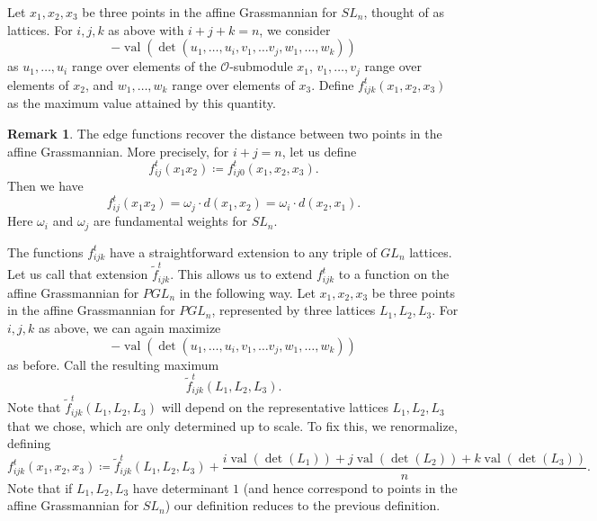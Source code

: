 \documentclass[10pt]{amsart}
\theoremstyle{definition}
\newtheorem{rema}[theorem]{Remark}
\newcommand{\cO}{\mathcal{O}}
\newcommand{\val}{\operatorname{val}}
\begin{document}
Let $x_1, x_2, x_3$ be three points in the affine Grassmannian for $SL_n$, thought of as lattices. For $i, j, k$ as above with $i+j+k=n$, we consider
\[
-\val(\det(u_1, \dots, u_i, v_1, \dots v_j, w_1, \dots, w_k))
\]
as $u_1, \dots, u_i$ range over elements of the $\cO$-submodule $x_1$, $v_1, \dots, v_j$ range over elements of $x_2$, and $w_1, \dots, w_k$ range over elements of $x_3$. Define $f_{ijk}^t (x_1,x_2,x_3)$ as the maximum value attained by this quantity.

\begin{rema} The edge functions recover the distance between two points in the affine Grassmannian. More precisely, for $i+j=n$, let us define
\[
f^t_{ij}(x_1x_2) \coloneqq  f_{ij0}^t (x_1,x_2,x_3).
\]
Then we have
\[
f^t_{ij}(x_1x_2) = \omega_j \cdot d(x_1,x_2) = \omega_i \cdot d(x_2,x_1).
\]
 Here $\omega_i$ and $\omega_j$ are fundamental weights for $SL_n$.
\end{rema}


The functions $f_{ijk}^t$ have a straightforward extension to any triple of $GL_n$ lattices. Let us call that extension $\tilde{f}_{ijk}^t.$ This allows us to extend $f_{ijk}^t$ to a function on the affine Grassmannian for $PGL_n$ in the following way. Let $x_1, x_2, x_3$ be three points in the affine Grassmannian for $PGL_n$, represented by three lattices $L_1, L_2, L_3$. For $i, j, k$ as above, we can again maximize
\[
-\val(\det(u_1, \dots, u_i, v_1, \dots v_j, w_1, \dots, w_k))
\]
as before. Call the resulting maximum
\[
\tilde{f}_{ijk}^t (L_1,L_2,L_3).
\]
 Note that $\tilde{f}_{ijk}^t (L_1,L_2,L_3)$ will depend on the representative lattices $L_1, L_2, L_3$ that we chose, which are only determined up to scale. To fix this, we renormalize, defining
\begin{equation} \label{PGLfunction}
f_{ijk}^t (x_1,x_2,x_3) \coloneqq  \tilde{f}_{ijk}^t (L_1,L_2,L_3) + \frac{i\val(\det(L_1)) + j\val(\det(L_2)) + k\val(\det(L_3))}{n}.
\end{equation}
Note that if $L_1, L_2, L_3$ have determinant $1$ (and hence correspond to points in the affine Grassmannian for $SL_n$) our definition reduces to the previous definition.
\end{document}
